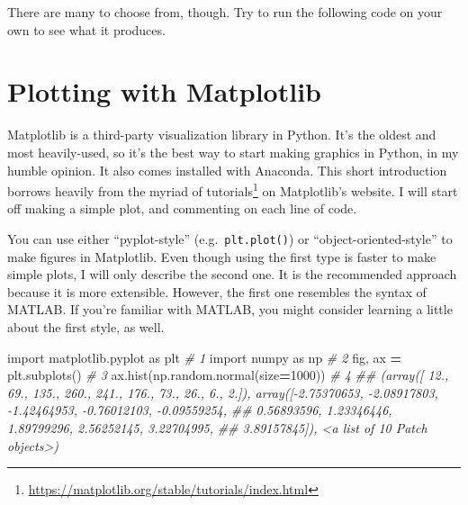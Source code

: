 \documentclass[
  12pt,
]{krantz}
\makeatletter
\newenvironment{Shaded}{\begin{snugshade}}{\end{snugshade}}
\newcommand{\AttributeTok}[1]{\textcolor[rgb]{0.61,0.61,0.61}{#1}}
\newcommand{\CommentTok}[1]{\textcolor[rgb]{0.37,0.37,0.37}{\textit{#1}}}
\newcommand{\DecValTok}[1]{\textcolor[rgb]{0.06,0.06,0.06}{#1}}
\newcommand{\FunctionTok}[1]{\textcolor[rgb]{0,0,0}{#1}}
\newcommand{\ImportTok}[1]{#1}
\newcommand{\NormalTok}[1]{#1}
\newcommand{\OperatorTok}[1]{\textcolor[rgb]{0.43,0.43,0.43}{\textbf{#1}}}
\newcommand{\OtherTok}[1]{\textcolor[rgb]{0.37,0.37,0.37}{#1}}
\newcommand{\SpecialCharTok}[1]{\textcolor[rgb]{0,0,0}{#1}}
\renewcommand{\href}[2]{#2\footnote{\url{#1}}}
\newenvironment{kframe}{%
\medskip{}
\setlength{\fboxsep}{.8em}
 \def\at@end@of@kframe{}%
 \ifinner\ifhmode%
  \def\at@end@of@kframe{\end{minipage}}%
  \begin{minipage}{\columnwidth}%
 \fi\fi%
 \def\FrameCommand##1{\hskip\@totalleftmargin \hskip-\fboxsep
 \colorbox{shadecolor}{##1}\hskip-\fboxsep
     \hskip-\linewidth \hskip-\@totalleftmargin \hskip\columnwidth}%
 \MakeFramed {\advance\hsize-\width
   \@totalleftmargin\z@ \linewidth\hsize
   \@setminipage}}%
 {\par\unskip\endMakeFramed%
 \at@end@of@kframe}
\renewenvironment{Shaded}{\begin{kframe}}{\end{kframe}}
\makeatother
\begin{document}
There are many to choose from, though. Try to run the following code on your own to see what it produces.

\begin{Shaded}
\end{Shaded}

\hypertarget{plotting-with-matplotlib}{%
\section{Plotting with Matplotlib}\label{plotting-with-matplotlib}}

Matplotlib \citep{Hunter:2007} is a third-party visualization library in Python. It's the oldest and most heavily-used, so it's the best way to start making graphics in Python, in my humble opinion. It also comes installed with Anaconda. This short introduction borrows heavily from the myriad of \href{https://matplotlib.org/stable/tutorials/index.html}{tutorials} on Matplotlib's website. I will start off making a simple plot, and commenting on each line of code.

You can use either ``pyplot-style'' (e.g.~\texttt{plt.plot()}) or ``object-oriented-style'' to make figures in Matplotlib. Even though using the first type is faster to make simple plots, I will only describe the second one. It is the recommended approach because it is more extensible. However, the first one resembles the syntax of MATLAB. If you're familiar with MATLAB, you might consider learning a little about the first style, as well.

\begin{Shaded}
\begin{Highlighting}[]
\ImportTok{import}\NormalTok{ matplotlib.pyplot }\ImportTok{as}\NormalTok{ plt       }\CommentTok{\# 1}
\ImportTok{import}\NormalTok{ numpy }\ImportTok{as}\NormalTok{ np                    }\CommentTok{\# 2}
\NormalTok{fig, ax }\OperatorTok{=}\NormalTok{ plt.subplots()              }\CommentTok{\# 3}
\NormalTok{ax.hist(np.random.normal(size}\OperatorTok{=}\DecValTok{1000}\NormalTok{))  }\CommentTok{\# 4}
\CommentTok{\#\# (array([ 12.,  69., 135., 260., 241., 176.,  73.,  26.,   6.,   2.]), array([{-}2.75370653, {-}2.08917803, {-}1.42464953, {-}0.76012103, {-}0.09559254,}
\CommentTok{\#\#         0.56893596,  1.23346446,  1.89799296,  2.56252145,  3.22704995,}
\CommentTok{\#\#         3.89157845]), \textless{}a list of 10 Patch objects\textgreater{})}
\end{Highlighting}
\end{Shaded}
\end{document}
